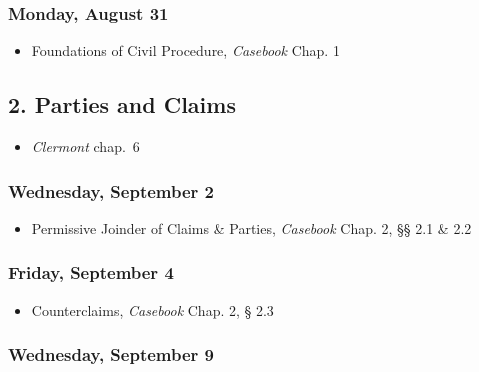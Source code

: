 \documentclass[11pt,letterpaper,twoside]{article}
\providecommand{\tightlist}{%
\setlength{\itemsep}{0em}\setlength{\parskip}{0em}\setlength{\itemindent}{0em}}
\begin{document}
\subsubsection*{Monday, August 31}\label{monday-august-31}

\begin{itemize}
\tightlist
\item
  Foundations of Civil Procedure, \emph{Casebook} Chap. 1
\end{itemize}

\subsection*{2. Parties and Claims}\label{parties-and-claims}

\begin{itemize}
\tightlist
\item
  \emph{Clermont} chap.~6
\end{itemize}

\subsubsection*{Wednesday, September 2}\label{wednesday-september-2}

\begin{itemize}
\tightlist
\item
  Permissive Joinder of Claims \& Parties, \emph{Casebook} Chap. 2, §§
  2.1 \& 2.2
\end{itemize}

\subsubsection*{Friday, September 4}\label{friday-september-4}

\begin{itemize}
\tightlist
\item
  Counterclaims, \emph{Casebook} Chap. 2, § 2.3
\end{itemize}

\subsubsection*{Wednesday, September 9}\label{wednesday-september-9}
\end{document}
